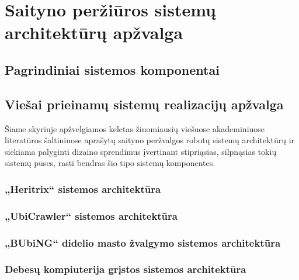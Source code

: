 \section{Saityno peržiūros sistemų architektūrų apžvalga}

\subsection{Pagrindiniai sistemos komponentai}

\subsection{Viešai prieinamų sistemų realizacijų apžvalga}

Šiame skyriuje apžvelgiamos keletas žinomiausių viešuose akademiniuose literatūros šaltiniuose aprašytų saityno peržvalgos robotų sistemų architektūrų ir siekiama palyginti dizaino sprendimus įvertinant stipriąsias, silpnąsias tokių sistemų puses, rasti bendras šio tipo sistemų komponentes.



\subsubsection{„Heritrix“ sistemos architektūra}
\subsubsection{„UbiCrawler“ sistemos architektūra}
\subsubsection{„BUbiNG“ didelio masto žvalgymo sistemos architektūra}
\subsubsection{Debesų kompiuterija grįstos sistemos architektūra}